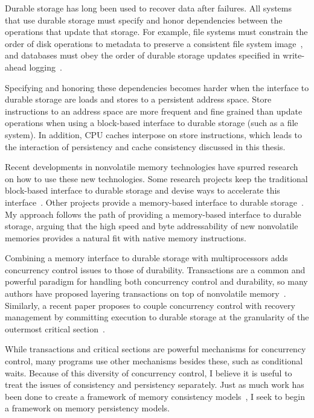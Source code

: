 Durable storage has long been used to recover data after failures.
All systems that use durable storage must specify and honor dependencies between the operations that update that storage.
For example, file systems must constrain the order of disk operations to metadata to preserve a consistent file system image~\cite{Ganger00,Chidambaram13}, and databases must obey the order of durable storage updates specified in write-ahead logging~\cite{MohanHaderle92}.

Specifying and honoring these dependencies becomes harder when the interface to durable storage are loads and stores to a persistent address space.
Store instructions to an address space are more frequent and fine grained than update operations when using a block-based interface to durable storage (such as a file system).
In addition, CPU caches interpose on store instructions, which leads to the interaction of persistency and cache consistency discussed in this thesis.

Recent developments in nonvolatile memory technologies have spurred research on how to use these new technologies.
Some research projects keep the traditional block-based interface to durable storage and devise ways to accelerate this interface~\cite{CaulfieldDe10}.
Other projects provide a memory-based interface to durable storage~\cite{CoburnCaulfield11}.
My approach follows the path of providing a memory-based interface to durable storage, arguing that the high speed and byte addressability of new nonvolatile memories provides a natural fit with native memory instructions.

Combining a memory interface to durable storage with multiprocessors adds concurrency control issues to those of durability.
Transactions are a common and powerful paradigm for handling both concurrency control and durability, so many authors have proposed layering transactions on top of nonvolatile memory~\cite{Lowell97,CoburnCaulfield11,VolosTack11,Coburn13}.
Similarly, a recent paper proposes to couple concurrency control with recovery management by committing execution to durable storage at the granularity of the outermost critical section~\cite{Chakrabarti13}.

While transactions and critical sections are powerful mechanisms for concurrency control, many programs use other mechanisms besides these, such as conditional waits.
Because of this diversity of concurrency control, I believe it is useful to treat the issues of consistency and persistency separately.
Just as much work has been done to create a framework of memory consistency models~\cite{Adve96}, I seek to begin a framework on memory persistency models.

